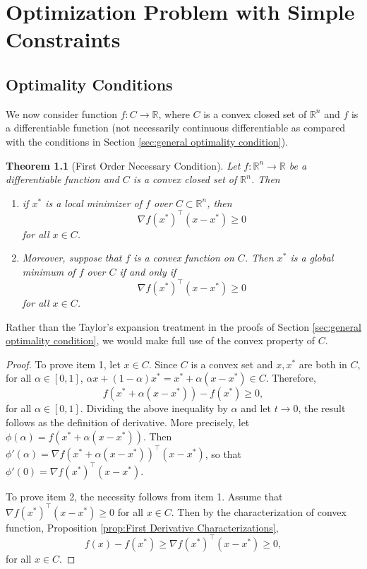 \documentclass[12pt,a4paper]{report}
\numberwithin{equation}{section}
\theoremstyle{mystyle}
\newtheorem{theorem}[definition]{Theorem}
\newcommand{\R}{\mathbb{R}}
\newcommand{\grad}{\nabla}
\newcommand{\T}{\top}
\begin{document}
	
	
	\chapter{Optimization Problem with Simple Constraints}
	\section{Optimality Conditions}
	We now consider function $f:C\to \R$, where $C$ is a convex closed set of $\R^n$ and $f$ is a differentiable function (not necessarily continuous differentiable as compared with the conditions in Section \ref{sec:general optimality condition}). 
	
	\begin{theorem}[First Order Necessary Condition]
		Let $f:\R^n\to \R$ be a differentiable function and $C$ is a convex closed set of $\R^n$. Then
		\begin{enumerate}
			\item if $x^*$ is a local minimizer of $f$ over $C\subset \R^n$, then
			$$
			\grad f(x^*)^\T (x-x^*)\geq 0
			$$
			for all $x\in C$.
			\item Moreover, suppose that $f$ is a convex function on $C$. Then $x^*$ is a global minimum of $f$ over $C$ if and only if
			$$
			\grad f(x^*)^\T (x-x^*)\geq 0
			$$
			for all $x\in C$.
		\end{enumerate}
	\end{theorem}
	Rather than the Taylor's expansion treatment in the proofs of Section \ref{sec:general optimality condition}, we would make full use of the convex property of $C$.
	\begin{proof}
		To prove item 1, let $x\in C$. Since $C$ is a convex set and $x,x^*$ are both in $C$, for all $\alpha\in [0,1]$, $\alpha x+(1-\alpha)x^*=x^*+\alpha(x-x^*)\in C$. Therefore,
		$$
		f(x^*+\alpha(x-x^*))-f(x^*)\geq 0,
		$$
		for all $\alpha\in [0,1]$. Dividing the above inequality by $\alpha$ and let $t\to 0$, the result follows as the definition of derivative. More precisely, let $\phi(\alpha)=f(x^*+\alpha(x-x^*))$. Then $\phi'(\alpha)=\grad f(x^*+\alpha (x-x^*))^\T (x-x^*)$, so that $\phi'(0)=\grad f(x^*)^\T (x-x^*)$.
		
		To prove item 2, the necessity follows from item 1. Assume that $\grad f(x^*)^\T (x-x^*)\geq 0$ for all $x\in C$. Then by the characterization of convex function, Proposition \ref{prop:First Derivative Characterizations},
		$$
		f(x)-f(x^*)\geq \grad f(x^*)^\T (x-x^*)\geq 0,
		$$
		for all $x\in C$.
	\end{proof}
	
\end{document}
